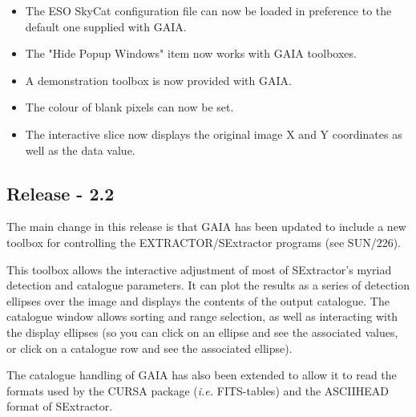 \documentclass[twoside,11pt]{article}
\newcommand{\xref}[3]{#1}
\renewcommand{\_}{\texttt{\symbol{95}}}
\begin{document}
\begin{itemize}
    \item The ESO SkyCat configuration file can now be loaded in
      preference to the default one supplied with GAIA.

    \item The "Hide Popup Windows" item now works with GAIA toolboxes.

    \item A demonstration toolbox is now provided with GAIA.

    \item The colour of blank pixels can now be set.

    \item The interactive slice now displays the original image X and Y
      coordinates as well as the data value.

\end{itemize}
\subsection{Release - 2.2}

The main change in this release is that GAIA has been updated to
include a new toolbox for controlling the EXTRACTOR/SExtractor
programs (see \xref{SUN/226}{sun226}{}).

This toolbox allows the interactive adjustment of most of SExtractor's
myriad detection and catalogue parameters. It can plot the results as
a series of detection ellipses over the image and displays the
contents of the output catalogue. The catalogue window allows sorting
and range selection, as well as interacting with the display ellipses
(so you can click on an ellipse and see the associated values, or
click on a catalogue row and see the associated ellipse).

The catalogue handling of GAIA has also been extended to allow it to
read the formats used by the \xref{CURSA}{sun190}{} package
({\em i.e.} FITS-tables) and the ASCII\_HEAD format of SExtractor.
\end{document}
